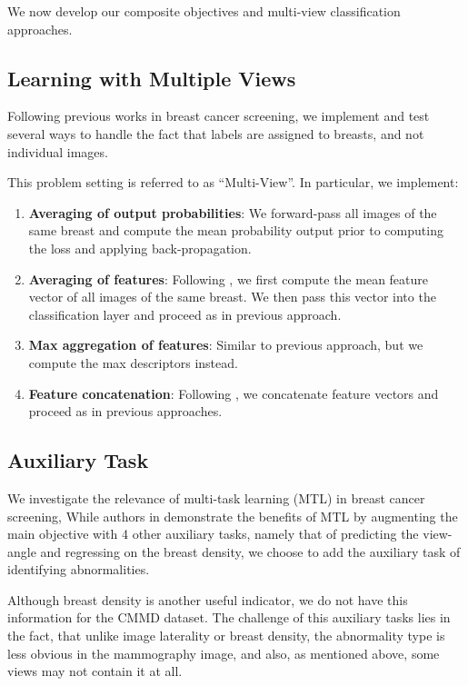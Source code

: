 \documentclass[11pt]{article}
\begin{document}
We now develop our composite objectives and multi-view classification approaches.

\subsection{\label{multiview}Learning with Multiple Views}
\label{sec:org0937e47}

Following previous works in breast cancer screening,
we implement and test several ways to handle the fact that
labels are assigned to breasts, and not individual images.

This problem setting is referred to as ``Multi-View''.
In particular, we implement:

\begin{enumerate}
\item \textbf{Averaging of output probabilities}:  We forward-pass all images of the same breast
and compute the mean probability output prior to computing the loss and applying
back-propagation.
\item \textbf{Averaging of features}: Following \autocite{geras17} \autocite{seeland21}, we first compute the mean feature vector of all images of the same
breast. We then pass this vector into the classification layer and proceed as in
previous approach.
\item \textbf{Max aggregation of features}: Similar to previous approach, but we compute the max descriptors instead.
\item \textbf{Feature concatenation}: Following \autocite{wu19} \autocite{chen22}, we concatenate feature
vectors and proceed as in previous approaches.
\end{enumerate}

\subsection{Auxiliary Task}
\label{sec:org8c77f58}

We investigate the relevance of multi-task learning (MTL) in breast cancer screening,
While authors in \autocite{tardy22} demonstrate the benefits of MTL
by augmenting the main objective with
4 other auxiliary tasks, namely that of predicting the view-angle and
regressing on the breast density,
we choose to add the auxiliary task of identifying abnormalities.

Although breast density is another useful indicator, we do not have this information for the CMMD dataset. The challenge of this auxiliary tasks lies in the fact, that unlike image laterality or breast density, the abnormality type is less obvious in the mammography image, and also, as mentioned above, some views may not contain it at all.
\end{document}
